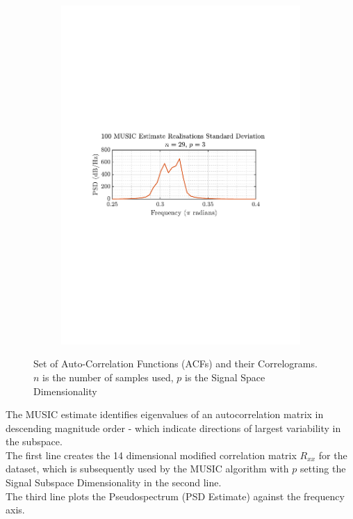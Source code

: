 \documentclass[12pt]{article}
\numberwithin{equation}{section}
\begin{document}
\begin{figure}[H]
\begin{subfigure}{0.49\textwidth}
			\includegraphics[trim={2.2cm 11.2cm 3.15cm  11.2cm}, clip, width=\textwidth]{../MATLAB/figures/q1_3e_fig06.pdf} 
		\end{subfigure}
		\captionsetup{justification=centering}
		\caption{Set of Auto-Correlation Functions (ACFs) and their Correlograms. \\ $n$ is the number of samples used, $p$ is the Signal Space Dimensionality}
		\label{fig: 1-3e}
	\end{figure}

	The MUSIC estimate identifies eigenvalues of an autocorrelation matrix in descending magnitude order - which indicate directions of largest variability in the subspace. \\
	The first line creates the 14 dimensional modified correlation matrix $R_{xx}$ for the dataset, which is subsequently used by the MUSIC algorithm with $p$ setting the Signal Subspace Dimensionality in the second line. \\
	The third line plots the Pseudospectrum (PSD Estimate) against the frequency axis. \\
	
\end{document}
